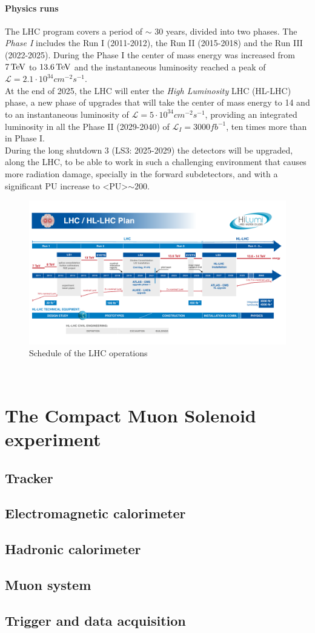 \paragraph*{Physics runs}
The LHC program covers a period of $\sim$ 30 years, divided into two phases. 
The \emph{Phase I} includes the Run I (2011-2012), the Run II (2015-2018) and the Run III (2022-2025).
During the Phase I the center of mass energy was increased from $7 {\,\text{Te\hspace{-.08em}V}}$ to $13.6 {\,\text{Te\hspace{-.08em}V}}$ and the instantaneous luminosity reached a peak of $\mathcal{L}= 2.1 \cdot 10^{34}cm^{-2} s^{-1}$. \\
At the end of 2025, the LHC will enter the \emph{High Luminosity} LHC (HL-LHC) phase, a new phase of upgrades that will take the center of mass energy to 14 \TeV and to an instantaneous luminosity of $\mathcal{L}=5 \cdot 10^{34}cm^{-2} s^{-1}$, providing an integrated luminosity in all the Phase II (2029-2040) of $\mathcal{L}_I=3000 fb^{-1}$, ten times more than in Phase I.\\
During the long shutdown 3 (LS3: 2025-2029) the detectors will be upgraded, along the LHC, to be able to work in such a challenging environment that causes more radiation damage, specially in the forward subdetectors, and with a significant PU increase to <PU>$\sim 200$. 

\begin{figure}[h!]
    \centering
    \includegraphics[width=1\linewidth]{fig//chap03-cms/LHC_schedule.pdf}
    \caption{Schedule of the LHC operations \cite{LS3Project}}
    \label{fig:lhc_schedule}
\end{figure}
\\




\section{The Compact Muon Solenoid experiment}
\subsection{Tracker}
\subsection{Electromagnetic calorimeter}
\subsection{Hadronic calorimeter}
\subsection{Muon system}
\subsection{Trigger and data acquisition}
